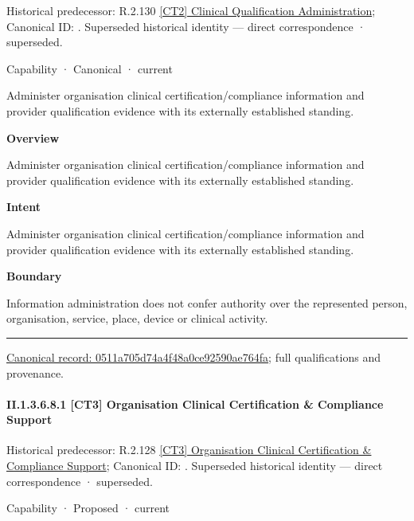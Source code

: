 {\small Historical predecessor: R.2.130 \hyperref[element:5fea7aaac4384245b1f08a3d8a076bd9]{[CT2] Clinical Qualification Administration}; Canonical ID: \texttt{}. Superseded historical identity — direct correspondence · superseded.}\par
\label{element:0511a705d74a4f48a0ce92590ae764fa}
{\small Capability · Canonical · current}\par

Administer organisation clinical certification/compliance information and provider qualification evidence with its externally established standing.



\textbf{Overview}



Administer organisation clinical certification/compliance information and provider qualification evidence with its externally established standing.



\textbf{Intent}



Administer organisation clinical certification/compliance information and provider qualification evidence with its externally established standing.



\textbf{Boundary}



Information administration does not confer authority over the represented person, organisation, service, place, device or clinical activity.



\medskip\hrule\medskip

{\footnotesize \href{../../../../continuum/strategy/capability/0511a705d74a4f48a0ce92590ae764fa.md}{Canonical record: 0511a705d74a4f48a0ce92590ae764fa}; full qualifications and provenance.}\par
\paragraph*{II.1.3.6.8.1 [CT3] Organisation Clinical Certification \& Compliance Support}
\label{navigation:II.1.3.6.8.1}

{\small Historical predecessor: R.2.128 \hyperref[element:cee76a930a4e4e7d9c49357ba290c8bf]{[CT3] Organisation Clinical Certification \& Compliance Support}; Canonical ID: \texttt{}. Superseded historical identity — direct correspondence · superseded.}\par
\label{element:4de624e7bf49472f91e3e5c734ee8725}
{\small Capability · Proposed · current}\par

